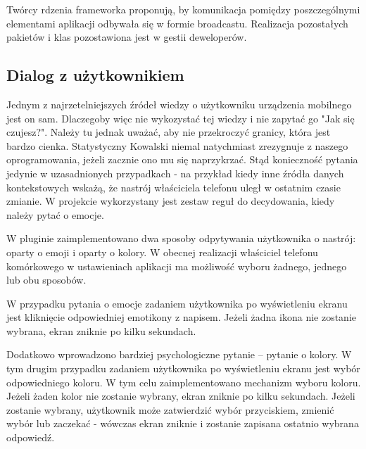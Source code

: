 Twórcy rdzenia frameworka proponują, by komunikacja pomiędzy poszczególnymi elementami aplikacji odbywała się w formie broadcastu. Realizacja pozostałych pakietów i klas pozostawiona jest w gestii deweloperów\cite{AwareFramework}. 


\subsection{Dialog z użytkownikiem}

Jednym z najrzetelniejszych źródeł wiedzy o użytkowniku urządzenia mobilnego jest on sam. Dlaczegoby więc nie wykozystać tej wiedzy i nie zapytać go "Jak się czujesz?". Należy tu jednak uważać, aby nie przekroczyć granicy, która jest bardzo cienka. Statystyczny Kowalski niemal natychmiast zrezygnuje z naszego oprogramowania, jeżeli zacznie ono mu się naprzykrzać. Stąd konieczność pytania jedynie w uzasadnionych przypadkach - na przykład kiedy inne źródła danych kontekstowych wskażą, że nastrój właściciela telefonu uległ w ostatnim czasie zmianie. W projekcie wykorzystany jest zestaw reguł do decydowania, kiedy należy pytać o emocje.

W pluginie zaimplementowano dwa sposoby odpytywania użytkownika o nastrój: oparty o emoji i oparty o kolory. W obecnej realizacji właściciel telefonu komórkowego w ustawieniach aplikacji ma możliwość wyboru żadnego, jednego lub obu sposobów.

W przypadku pytania o emocje zadaniem użytkownika po wyświetleniu ekranu jest kliknięcie odpowiedniej emotikony z napisem. Jeżeli żadna ikona nie zostanie wybrana, ekran zniknie po kilku sekundach.

Dodatkowo wprowadzono bardziej psychologiczne pytanie -- pytanie o kolory. W tym drugim przypadku zadaniem użytkownika po wyświetleniu ekranu jest wybór odpowiedniego koloru. W tym celu zaimplementowano mechanizm wyboru koloru. Jeżeli żaden kolor nie zostanie wybrany, ekran zniknie po kilku sekundach. Jeżeli zostanie wybrany, użytkownik może zatwierdzić wybór przyciskiem, zmienić wybór lub zaczekać - wówczas ekran zniknie i zostanie zapisana ostatnio wybrana odpowiedź.

